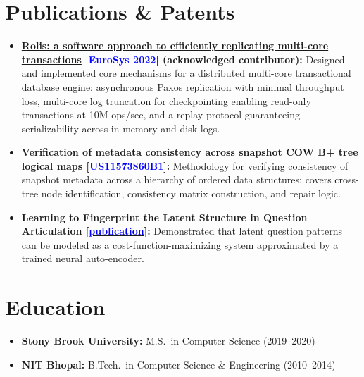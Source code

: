 \documentclass[letterpaper,11pt]{article}
\newcommand{\resumeItem}[2]{
  \item\small{\textbf{#1}{ #2 \vspace{-2pt}}}
}
\newcommand{\resumeSubItem}[2]{\resumeItem{#1}{#2}\vspace{-4pt}}
\newcommand{\resumeSubHeadingListStart}{\begin{itemize}[leftmargin=*]}
\newcommand{\resumeSubHeadingListEnd}{\end{itemize}}
\begin{document}
\section{Publications \& Patents}
  \resumeSubHeadingListStart
    \resumeSubItem{\href{https://dl.acm.org/doi/10.1145/3492321.3519576}{Rolis: a software approach to efficiently replicating multi-core transactions} [\textcolor{blue}{EuroSys 2022}] (acknowledged contributor):}
      {Designed and implemented core mechanisms for a distributed multi-core transactional database engine: asynchronous Paxos replication with minimal throughput loss, multi-core log truncation for checkpointing enabling read-only transactions at 10M ops/sec, and a replay protocol guaranteeing serializability across in-memory and disk logs.}
    \resumeSubItem{Verification of metadata consistency across snapshot COW B+ tree logical maps [\href{https://patents.google.com/patent/US11573860B1}{\textcolor{blue}{US11573860B1}}]:}
      {Methodology for verifying consistency of snapshot metadata across a hierarchy of ordered data structures; covers cross-tree node identification, consistency matrix construction, and repair logic.}
    \resumeSubItem{Learning to Fingerprint the Latent Structure in Question Articulation [\href{https://ieeexplore.ieee.org/document/8614044}{\textcolor{blue}{publication}}]:}
      {Demonstrated that latent question patterns can be modeled as a cost-function-maximizing system approximated by a trained neural auto-encoder.}
  \resumeSubHeadingListEnd

\section{Education}
  \resumeSubHeadingListStart
    \resumeSubItem{Stony Brook University:}{M.S.\ in Computer Science (2019--2020)}
    \resumeSubItem{NIT Bhopal:}{B.Tech.\ in Computer Science \& Engineering (2010--2014)}
  \resumeSubHeadingListEnd
\end{document}
